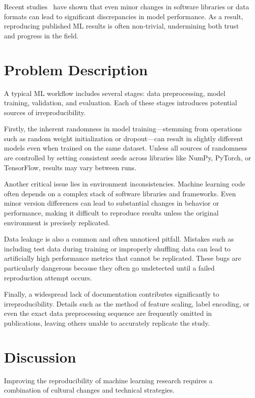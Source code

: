 \documentclass[11pt]{article}
\begin{document}
Recent studies~\cite{DBLP:journals/ncs/X21i,DBLP:conf/qrs/Rivera-LandosKN21} have shown that even 
 minor changes in software libraries or data formats can lead to significant discrepancies in 
 model performance. 
%
As a result, reproducing published ML results is often non-trivial, 
 undermining both trust and progress in the field.

\section{Problem Description}
\label{sec:problem}
A typical ML workflow includes several stages: data preprocessing, model training, validation, and evaluation. Each of these stages introduces potential sources of irreproducibility.

Firstly, the inherent randomness in model training—stemming from operations such as random weight initialization or dropout—can result in slightly different models even when trained on the same dataset. Unless all sources of randomness are controlled by setting consistent seeds across libraries like NumPy, PyTorch, or TensorFlow, results may vary between runs.

Another critical issue lies in environment inconsistencies. Machine learning code often depends on a complex stack of software libraries and frameworks. Even minor version differences can lead to substantial changes in behavior or performance, making it difficult to reproduce results unless the original environment is precisely replicated.

Data leakage is also a common and often unnoticed pitfall. Mistakes such as including test data during training or improperly shuffling data can lead to artificially high performance metrics that cannot be replicated. These bugs are particularly dangerous because they often go undetected until a failed reproduction attempt occurs.

Finally, a widespread lack of documentation contributes significantly to irreproducibility. Details such as the method of feature scaling, label encoding, or even the exact data preprocessing sequence are frequently omitted in publications, leaving others unable to accurately replicate the study.


\section{Discussion}
\label{sec:system}
Improving the reproducibility of machine learning research requires a combination of cultural changes and technical strategies.
\end{document}

